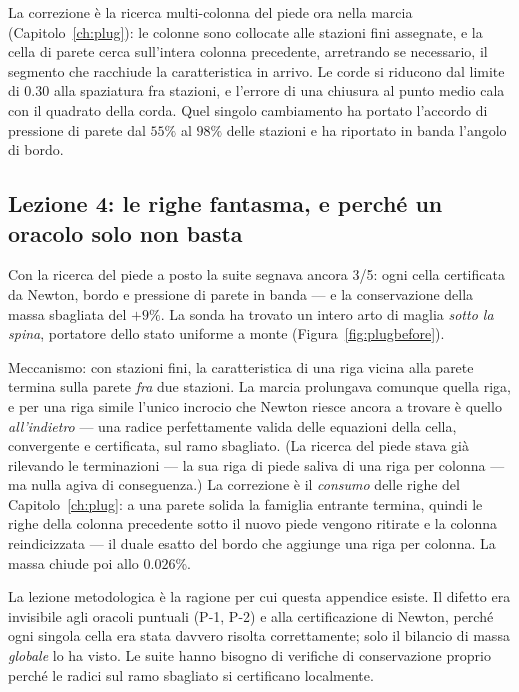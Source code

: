 La correzione è la ricerca multi-colonna del piede ora nella marcia
(Capitolo~\ref{ch:plug}): le colonne sono collocate alle stazioni
fini assegnate, e la cella di parete cerca sull'intera colonna
precedente, arretrando se necessario, il segmento che racchiude la
caratteristica in arrivo. Le corde si riducono dal limite di $0.30$
alla spaziatura fra stazioni, e l'errore di una chiusura al punto
medio cala con il quadrato della corda. Quel singolo cambiamento ha
portato l'accordo di pressione di parete dal $55\%$ al $98\%$ delle
stazioni e ha riportato in banda l'angolo di bordo.

\subsection{Lezione 4: le righe fantasma, e perché un oracolo solo non
basta}
\label{app:ghostrows}

Con la ricerca del piede a posto la suite segnava ancora 3/5: ogni
cella certificata da Newton, bordo e pressione di parete in banda ---
e la conservazione della massa sbagliata del $+9\%$. La sonda ha
trovato un intero arto di maglia \emph{sotto la spina}, portatore
dello stato uniforme a monte (Figura~\ref{fig:plugbefore}).

Meccanismo: con stazioni fini, la caratteristica di una riga vicina
alla parete termina sulla parete \emph{fra} due stazioni. La marcia
prolungava comunque quella riga, e per una riga simile l'unico
incrocio che Newton riesce ancora a trovare è quello
\emph{all'indietro} --- una radice perfettamente valida delle
equazioni della cella, convergente e certificata, sul ramo sbagliato.
(La ricerca del piede stava già rilevando le terminazioni --- la sua
riga di piede saliva di una riga per colonna --- ma nulla agiva di
conseguenza.) La correzione è il \emph{consumo} delle righe del
Capitolo~\ref{ch:plug}: a una parete solida la famiglia entrante
termina, quindi le righe della colonna precedente sotto il nuovo piede
vengono ritirate e la colonna reindicizzata --- il duale esatto del
bordo che aggiunge una riga per colonna. La massa chiude poi allo
$0.026\%$.

La lezione metodologica è la ragione per cui questa appendice esiste.
Il difetto era invisibile agli oracoli puntuali (P-1, P-2) e alla
certificazione di Newton, perché ogni singola cella era stata
davvero risolta correttamente; solo il bilancio di massa
\emph{globale} lo ha visto. Le suite hanno bisogno di verifiche di
conservazione proprio perché le radici sul ramo sbagliato si
certificano localmente.

